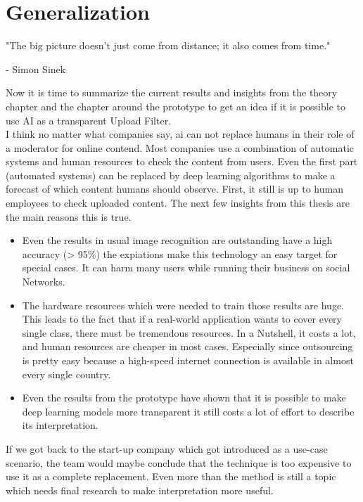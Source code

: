 
\chapter{Generalization}
\label{ch:generalization}
\epigraph{"The big picture doesn't just come from distance; it also comes from time."}{- Simon Sinek}

Now it is time to summarize the current results and insights from the theory chapter and the chapter around the prototype to get an idea if it is possible to use AI as a transparent Upload Filter.\\

I think no matter what companies say, \gls{ai} can not replace humans in their role of a moderator for online contend. Most companies use a combination of automatic systems and human resources to check the content from users. Even the first part (automated systems) can be replaced by deep learning algorithms to make a forecast of which content humans should observe. First, it still is up to human employees to check uploaded content. The next few insights from this thesis are the main reasons this is true.

\begin{itemize}
	\item Even the results in usual image recognition are outstanding have a high accuracy (> 95\%) the expiations make this technology an easy target for special cases. It can harm many users while running their business on social Networks.
	\item The hardware resources which were needed to train those results are huge. This leads to the fact that if a real-world application wants to cover every single class, there must be tremendous resources. In a Nutshell, it costs a lot, and human resources are cheaper in most cases. Especially since outsourcing is pretty easy because a high-speed internet connection is available in almost every single country.
	\item Even the results from the prototype have shown that it is possible to make deep learning models more transparent it still costs a lot of effort to describe its interpretation.
\end{itemize}

If we got back to the start-up company which got introduced as a use-case scenario, the team would maybe conclude that the technique is too expensive to use it as a complete replacement. Even more than the method is still a topic which needs final research to make interpretation more useful.\\

